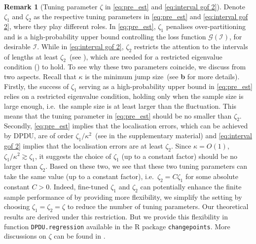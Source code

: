 \documentclass[11pt]{article}
\theoremstyle{plain}
\theoremstyle{definition}
\newtheorem{remark}{Remark}
\newcommand{\zifeng}[1]{\textcolor{purple}{(Zifeng: #1)}}
\begin{document}
\begin{remark}[Tuning parameter $\zeta$ in \eqref{eq:pre_est} and \eqref{eq:interval gof 2}] 
Denote $\zeta_1$ and $\zeta_2$ as the respective tuning parameters in \eqref{eq:pre_est} and \eqref{eq:interval gof 2}, where they play different roles.  In \eqref{eq:pre_est}, $\zeta_1$ penalises over-partitioning and is a high-probability upper bound controlling the loss function $\mathcal{G}(\mathcal{I})$, for desirable $\mathcal{I}$.  While in \eqref{eq:interval gof 2}, $\zeta_2$ restricts the attention to the intervals of lengths at least $\zeta_2$~(see ), which are needed for a restricted eigenvalue condition () to hold.  To see why these two parameters coincide, we discuss from two aspects. Recall that $\kappa$ is the minimum jump size~(see \textbf{b} for more details).  Firstly, the success of $\zeta_1$ serving as a high-probability upper bound in \eqref{eq:pre_est} relies on a restricted eigenvalue condition, holding only when the sample size is large enough, i.e.~the sample size is at least larger than the fluctuation.  This means that the tuning parameter in \eqref{eq:pre_est} should be no smaller than $\zeta_2$. Secondly, \eqref{eq:pre_est} implies that the localisation errors, which can be achieved by DPDU, are of order $\zeta_1/\kappa^2$~(see  in the supplementary material) and \eqref{eq:interval gof 2} implies that the localisation errors are at least $\zeta_2$.  Since $\kappa = O(1)$, $\zeta_1/\kappa^2 \gtrsim \zeta_1$, it suggests the choice of $\zeta_1$ (up to a constant factor) should be no larger than $\zeta_2$.  Based on these two, we see that these two tuning parameters can take the same value (up to a constant factor), i.e.~$\zeta_2 = C\zeta_1$ for some absolute constant $C>0$.  Indeed, fine-tuned $\zeta_1$ and $\zeta_2$ can potentially enhance the finite sample performance of  by providing more flexibility, we simplify the setting by choosing $\zeta_1 = \zeta_2 = \zeta$ to reduce the number of tuning parameters. Our theoretical results are derived under this restriction.  But we provide this flexibility in function \texttt{DPDU.regression} available in the R package \texttt{changepoints}.  More discussions on $\zeta$ can be found in .
\end{remark}
\end{document}
